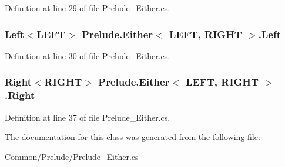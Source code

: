 Definition at line 29 of file Prelude\+\_\+\+Either.\+cs.

\hypertarget{class_prelude_1_1_either_3_01_l_e_f_t_00_01_r_i_g_h_t_01_4_a4330760975e79ad64dd43fdff183d411}{
\subsubsection[{Left}]{\setlength{\rightskip}{0pt plus 5cm}Left$<$L\+E\+F\+T$>$ Prelude.\+Either$<$ L\+E\+F\+T, R\+I\+G\+H\+T $>$.Left\hspace{0.3cm}{\ttfamily [get]}}}\label{class_prelude_1_1_either_3_01_l_e_f_t_00_01_r_i_g_h_t_01_4_a4330760975e79ad64dd43fdff183d411}


Definition at line 30 of file Prelude\+\_\+\+Either.\+cs.

\hypertarget{class_prelude_1_1_either_3_01_l_e_f_t_00_01_r_i_g_h_t_01_4_ab9e80a843929ecdd2860f3a7d1ed593a}{
\subsubsection[{Right}]{\setlength{\rightskip}{0pt plus 5cm}Right$<$R\+I\+G\+H\+T$>$ Prelude.\+Either$<$ L\+E\+F\+T, R\+I\+G\+H\+T $>$.Right\hspace{0.3cm}{\ttfamily [get]}}}\label{class_prelude_1_1_either_3_01_l_e_f_t_00_01_r_i_g_h_t_01_4_ab9e80a843929ecdd2860f3a7d1ed593a}


Definition at line 37 of file Prelude\+\_\+\+Either.\+cs.



The documentation for this class was generated from the following file\+:\begin{DoxyCompactItemize}
\item 
Common/\+Prelude/\hyperlink{_prelude___either_8cs}{Prelude\+\_\+\+Either.\+cs}\end{DoxyCompactItemize}
